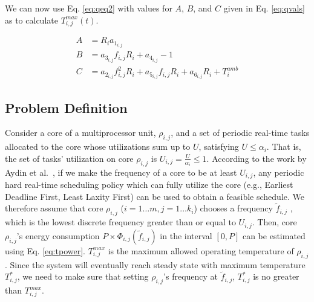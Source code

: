 \documentclass[conference]{IEEEtran}
\newtheorem{proposition}{Proposition}
\begin{document}
We can now use Eq. \ref{eq:qeq2} with values for $A$, $B$, and $C$ given in Eq. \ref{eq:qvals} as to calculate $T^{max}_{i,j}(t)$.

\begin{subequations} \label{eq:qvals}
	\begin{align}
		A &= R_ia_{1_{i,j}}\\
		B &= a_{3_{i,j}}f_{i,j}R_i + a_{4_{i,j}} - 1\\
		C &= a_{2_{i,j}}f^{2}_{i,j}R_i + a_{5_{i,j}}f_{i,j}R_i + a_{6_{i,j}}R_i + T_i^{amb}
	\end{align}
\end{subequations}

\subsection{Problem Definition}
\label{sec:pd}

Consider a core of a multiprocessor unit, $\rho_{i,j}$, and a set of periodic real-time tasks allocated to the core whose utilizations sum up to $U$, satisfying $U \leq \alpha_i$. That is, the set of tasks' utilization on core $\rho_{i,j}$ is $U_{i,j} = \frac{U}{\alpha_i} \leq 1$.
%
%
According to the work by Aydin et al.~\cite{Aydin01}, if we make the frequency of a core to be at least $U_{i,j}$, any periodic hard real-time scheduling policy which can fully utilize the core (e.g., Earliest Deadline First, Least Laxity First) can be used to obtain a feasible schedule.
We therefore assume that core $\rho_{i,j}$ ($i=1 \ldots m, j=1 \ldots k_i$) chooses a frequency $\tilde{f}_{i,j}$ , which is the lowest discrete frequency  greater than or equal to $U_{i,j}$. Then, core $\rho_{i,j}$'s energy consumption  $P \times \Phi_{i,j}(\tilde{f}_{i,j})$ in the interval $[0,P]$ can be estimated using Eq. \ref{eq:tpower}.
$T^{max}_{i,j}$ is the maximum allowed operating temperature of $\rho_{i,j}$.
Since the system will eventually reach  steady state with maximum temperature $T^*_{i,j}$, we need to make sure that setting $\rho_{i,j}$'s frequency at $\tilde{f}_{i,j}$, $T^*_{i,j}$ is no greater than $T^{max}_{i,j}$.
\end{document}
